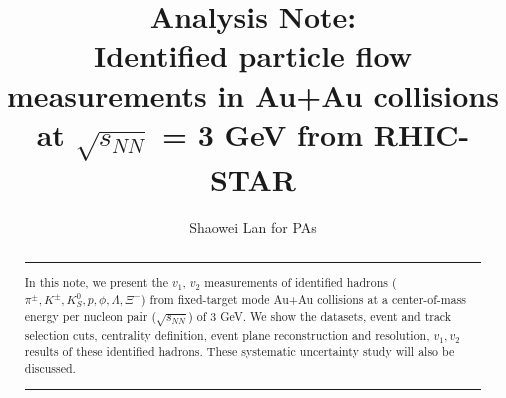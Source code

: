 \documentclass[preprint,showpacs,aps,prc,superscriptaddress]{revtex4-1}
\begin{document}
\preprint{}

\title{
\Huge{Analysis Note: \\ \textbf{Identified particle flow measurements in Au+Au collisions at $\sqrt{s_{NN}}$ = 3 GeV from RHIC-STAR}}
}
\author{\Large{Shaowei Lan for PAs}}


\begin{abstract}

\noindent\rule[0.25\baselineskip]{\textwidth}{1pt}
\large{In this note, we present the $v_1$, $v_2$ measurements of identified hadrons ($\pi^{\pm}, K^{\pm}, K_{S}^{0}, p, \phi, \Lambda, \Xi^{-}$) from fixed-target mode Au+Au collisions at a center-of-mass energy per nucleon pair ($\sqrt{s_{NN}}$) of 3 GeV. We show the datasets, event and track selection cuts, centrality definition, event plane reconstruction and resolution, $v_{1}, v_{2}$ results of these identified hadrons. These systematic uncertainty study will also be discussed.}
\noindent\rule[0.25\baselineskip]{\textwidth}{1pt}
\end{abstract}

\maketitle
\listoffigures
\listoftables
\tableofcontents

\newpage


\linenumbers
\clearpage
\clearpage
\clearpage
\clearpage
\clearpage
\clearpage



\clearpage

%

%

%
\end{document}
